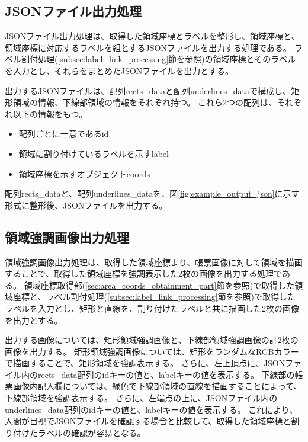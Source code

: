 \subsection{JSONファイル出力処理}\label{subsec:json_file_output_processing}
JSONファイル出力処理は、取得した領域座標とラベルを整形し、領域座標と、領域座標に対応するラベルを組とするJSONファイルを出力する処理である。
ラベル割付処理(\ref{subsec:label_link_processing}節を参照)の領域座標とそのラベルを入力とし、それらをまとめたJSONファイルを出力とする。

出力するJSONファイルは、配列rects\_dataと配列underlines\_dataで構成し、矩形領域の情報、下線部領域の情報をそれぞれ持つ。
これら2つの配列は、それぞれ以下の情報をもつ。

\begin{itemize}
    \item 配列ごとに一意であるid
    \item 領域に割り付けているラベルを示すlabel
    \item 領域座標を示すオブジェクトcoords
\end{itemize}

配列rects\_dataと、配列underlines\_dataを、図\ref{fig:example_output_json}に示す形式に整形後、JSONファイルを出力する。

\subsection{領域強調画像出力処理}\label{subsec:area_highlighted_image_output_processing}
領域強調画像出力処理は、取得した領域座標より、帳票画像に対して領域を描画することで、取得した領域座標を強調表示した2枚の画像を出力する処理である。
領域座標取得部(\ref{sec:area_coords_obtainment_part}節を参照)で取得した領域座標と、ラベル割付処理(\ref{subsec:label_link_processing}節を参照)で取得したラベルを入力とし、矩形と直線を、割り付けたラベルと共に描画した2枚の画像を出力とする。

出力する画像については、矩形領域強調画像と、下線部領域強調画像の計2枚の画像を出力する。
矩形領域強調画像については、矩形をランダムなRGBカラーで描画することで、矩形領域を強調表示する。
さらに、左上頂点に、JSONファイル内のrects\_data配列のidキーの値と、labelキーの値を表示する。
下線部の帳票画像内記入欄については、緑色で下線部領域の直線を描画することによって、下線部領域を強調表示する。
さらに、左端点の上に、JSONファイル内のunderlines\_data配列のidキーの値と、labelキーの値を表示する。
これにより、人間が目視でJSONファイルを確認する場合と比較して、取得した領域座標と割り付けたラベルの確認が容易となる。

